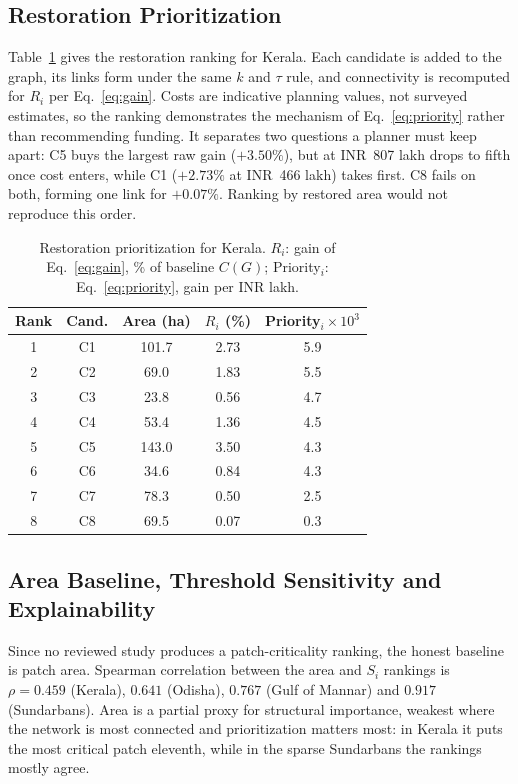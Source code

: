 \documentclass[conference]{IEEEtran}
\begin{document}
\subsection{Restoration Prioritization}

Table~\ref{tab:restoreresults} gives the restoration ranking for Kerala. Each candidate is added to the graph, its links form under the same $k$ and $\tau$ rule, and connectivity is recomputed for $R_i$ per Eq.~\eqref{eq:gain}. Costs are indicative planning values, not surveyed estimates, so the ranking demonstrates the mechanism of Eq.~\eqref{eq:priority} rather than recommending funding. It separates two questions a planner must keep apart: C5 buys the largest raw gain ($+3.50\%$), but at INR~807 lakh drops to fifth once cost enters, while C1 ($+2.73\%$ at INR~466 lakh) takes first. C8 fails on both, forming one link for $+0.07\%$. Ranking by restored area would not reproduce this order.

\begin{table}[!tbp]
\centering
\caption{Restoration prioritization for Kerala. $R_i$: gain of Eq.~\eqref{eq:gain}, \% of baseline $C(G)$; Priority$_i$: Eq.~\eqref{eq:priority}, gain per INR lakh.}
\label{tab:restoreresults}
\scriptsize
\setlength{\tabcolsep}{4pt}
\renewcommand{\arraystretch}{0.95}
\begin{tabular}{@{}ccccc@{}}
\toprule
\textbf{Rank} & \textbf{Cand.} & \textbf{Area (ha)} & $R_i$ (\%) & \textbf{Priority}$_i \!\times\! 10^{3}$ \\
\midrule
1 & C1 & 101.7 & 2.73 & 5.9 \\
2 & C2 & 69.0  & 1.83 & 5.5 \\
3 & C3 & 23.8  & 0.56 & 4.7 \\
4 & C4 & 53.4  & 1.36 & 4.5 \\
5 & C5 & 143.0 & 3.50 & 4.3 \\
6 & C6 & 34.6  & 0.84 & 4.3 \\
7 & C7 & 78.3  & 0.50 & 2.5 \\
8 & C8 & 69.5  & 0.07 & 0.3 \\
\bottomrule
\end{tabular}
\end{table}

\subsection{Area Baseline, Threshold Sensitivity and Explainability}

Since no reviewed study produces a patch-criticality ranking, the honest baseline is patch area. Spearman correlation between the area and $S_i$ rankings is $\rho = 0.459$ (Kerala), $0.641$ (Odisha), $0.767$ (Gulf of Mannar) and $0.917$ (Sundarbans). Area is a partial proxy for structural importance, weakest where the network is most connected and prioritization matters most: in Kerala it puts the most critical patch eleventh, while in the sparse Sundarbans the rankings mostly agree.
\end{document}
